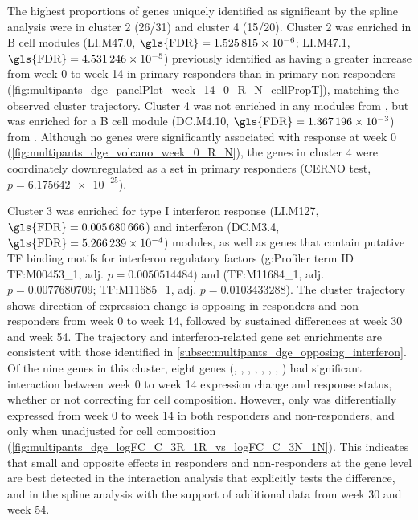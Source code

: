 The highest proportions of genes uniquely identified as significant by the spline analysis were in cluster 2 (26/31) and cluster 4 (15/20).
Cluster 2 was enriched in \textcite{li2013MolecularSignaturesAntibody} B cell modules (LI.M47.0, $\text{\gls{FDR}} = \num{1.525815e-06}$; LI.M47.1, $\text{\gls{FDR}} = \num{4.531246e-05}$)
previously identified as having a greater increase from week 0 to week 14 in primary responders than in primary non-responders (\cref{fig:multipants_dge_panelPlot_week_14_0_R_N_cellPropT}),
matching the observed cluster trajectory.
Cluster 4 was not enriched in any modules from \textcite{li2013MolecularSignaturesAntibody}, but was enriched for a B cell module (DC.M4.10, $\text{\gls{FDR}} = \num[scientific-notation = true]{0.001367196}$) from \textcite{chaussabel2008ModularAnalysisFramework}.
Although no genes were significantly associated with response at week 0 (\cref{fig:multipants_dge_volcano_week_0_R_N}),
the genes in cluster 4 were coordinately downregulated as a set in primary responders (CERNO test, $p=\num{6.175642e-25}$).

Cluster 3 was enriched for type I interferon response (LI.M127, $\text{\gls{FDR}} = \num{0.005680666}$) and interferon (DC.M3.4, $\text{\gls{FDR}} = \num[scientific-notation = true]{0.0005266239}$) modules,
as well as genes that contain putative \gls{TF} binding motifs for interferon regulatory factors  ({g:Profiler} \autocite{raudvere2019ProfilerWebServer} term ID TF:M00453\_1, adj. $p=\num{0.0050514484}$) 
and  (TF:M11684\_1, adj. $p=\num{0.0077680709}$; TF:M11685\_1, adj. $p=\num{0.0103433288}$).
The cluster trajectory shows direction of expression change is opposing in responders and non-responders from week 0 to week 14, followed by sustained differences at week 30 and week 54.
The trajectory and interferon-related gene set enrichments are consistent with those identified in \cref{subsec:multipants_dge_opposing_interferon}.
Of the nine genes in this cluster, eight genes (, , , , , , , )
had significant interaction between week 0 to week 14 expression change and response status,
whether or not correcting for cell composition.
However, only  was differentially expressed from week 0 to week 14 in both responders and non-responders,
and only when unadjusted for cell composition (\cref{fig:multipants_dge_logFC_C_3R_1R_vs_logFC_C_3N_1N}).
This indicates that small and opposite effects in responders and non-responders at the gene level are best detected 
in the interaction analysis that explicitly tests the difference,
and in the spline analysis with the support of additional data from week 30 and week 54.

